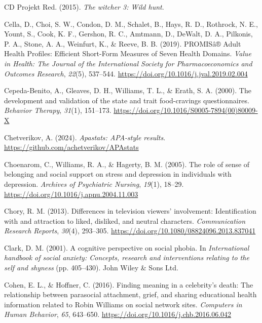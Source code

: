 \documentclass[
]{udthesis}
\newlength{\cslhangindent}
\newenvironment{CSLReferences}[2] %
 {\begin{list}{}{%
  \setlength{\itemindent}{0pt}
  \setlength{\leftmargin}{0pt}
  \setlength{\parsep}{0pt}
  \ifodd #1
   \setlength{\leftmargin}{\cslhangindent}
   \setlength{\itemindent}{-1\cslhangindent}
  \fi
  \setlength{\itemsep}{#2\baselineskip}}}
 {\end{list}}
\begin{document}
\begin{CSLReferences}{1}{0}
CD Projekt Red. (2015). \emph{The witcher 3: Wild hunt}.

Cella, D., Choi, S. W., Condon, D. M., Schalet, B., Hays, R. D., Rothrock, N. E., Yount, S., Cook, K. F., Gershon, R. C., Amtmann, D., DeWalt, D. A., Pilkonis, P. A., Stone, A. A., Weinfurt, K., \& Reeve, B. B. (2019). {PROMIS}â® {Adult Health Profiles}: {Efficient Short}-{Form Measures} of {Seven Health Domains}. \emph{Value in Health: The Journal of the International Society for Pharmacoeconomics and Outcomes Research}, \emph{22}(5), 537--544. \url{https://doi.org/10.1016/j.jval.2019.02.004}

Cepeda-Benito, A., Gleaves, D. H., Williams, T. L., \& Erath, S. A. (2000). The development and validation of the state and trait food-cravings questionnaires. \emph{Behavior Therapy}, \emph{31}(1), 151--173. \url{https://doi.org/10.1016/S0005-7894(00)80009-X}

Chetverikov, A. (2024). \emph{Apastats: APA-style results}. \url{https://github.com/achetverikov/APAstats}

Choenarom, C., Williams, R. A., \& Hagerty, B. M. (2005). The role of sense of belonging and social support on stress and depression in individuals with depression. \emph{Archives of Psychiatric Nursing}, \emph{19}(1), 18--29. \url{https://doi.org/10.1016/j.apnu.2004.11.003}

Chory, R. M. (2013). Differences in television viewers{'} involvement: Identification with and attraction to liked, disliked, and neutral characters. \emph{Communication Research Reports}, \emph{30}(4), 293--305. \url{https://doi.org/10.1080/08824096.2013.837041}

Clark, D. M. (2001). A cognitive perspective on social phobia. In \emph{International handbook of social anxiety: {Concepts}, research and interventions relating to the self and shyness} (pp. 405--430). {John Wiley \& Sons Ltd}.

Cohen, E. L., \& Hoffner, C. (2016). Finding meaning in a celebrity{'}s death: The relationship between parasocial attachment, grief, and sharing educational health information related to Robin Williams on social network sites. \emph{Computers in Human Behavior}, \emph{65}, 643--650. \url{https://doi.org/10.1016/j.chb.2016.06.042}


\end{CSLReferences}
\end{document}
